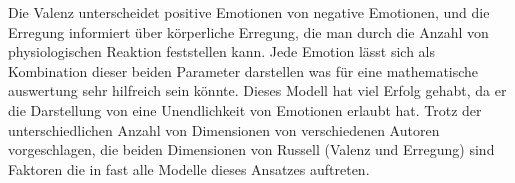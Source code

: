 Die Valenz unterscheidet positive Emotionen von negative Emotionen, und die Erregung informiert {\"u}ber k{\"o}rperliche Erregung, die man durch die Anzahl von physiologischen Reaktion feststellen kann. 
Jede Emotion l{\"a}sst sich als Kombination dieser beiden Parameter darstellen was f{\"u}r eine mathematische auswertung sehr hilfreich sein k{\"o}nnte. 
Dieses Modell hat viel Erfolg gehabt, da er die Darstellung von eine Unendlichkeit von Emotionen erlaubt hat. 
Trotz der unterschiedlichen Anzahl von Dimensionen von verschiedenen Autoren vorgeschlagen, die beiden Dimensionen von Russell (Valenz und Erregung) sind Faktoren die in fast alle Modelle dieses Ansatzes auftreten.



